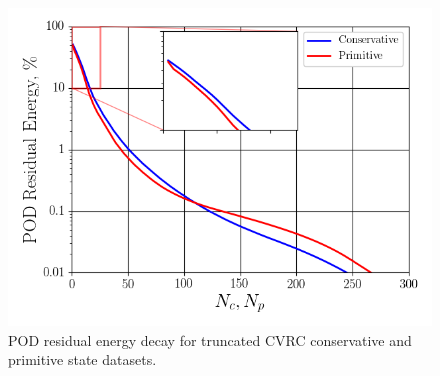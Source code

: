 \begin{figure}
	\centering
	\includegraphics[width=0.8\linewidth]{Chapters/HPROMResults/Images/cvrc/cvrc_pod_energy_0p5ms.png}
	\caption{\label{fig:cvrcPODEnergy}POD residual energy decay for truncated CVRC conservative and primitive state datasets.}
\end{figure}

